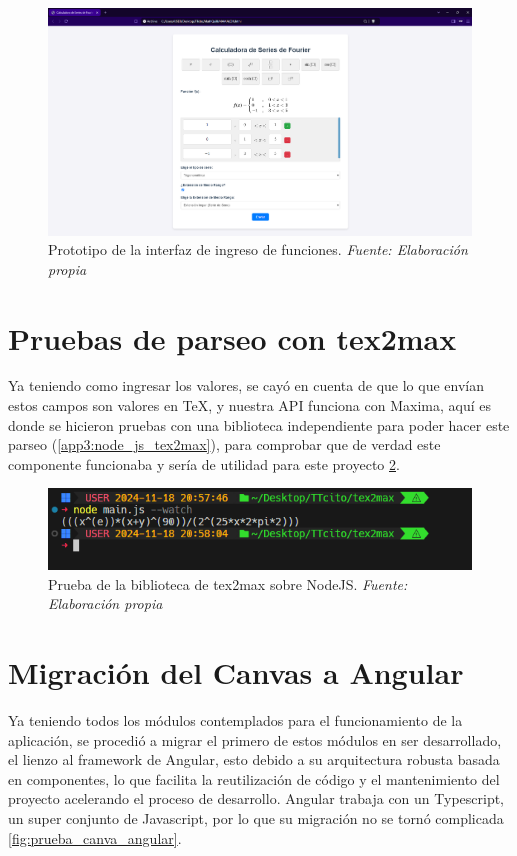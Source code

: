 \begin{figure}[H]
	\centering
	\includegraphics[width=1\textwidth]{img/chapter06/prueba_UI.png}
	\caption[Prototipo de la interfaz de ingreso de funciones.]{Prototipo de la interfaz de ingreso de funciones. \textit{Fuente: Elaboración propia}}
	\label{fig:prueba_UI}
\end{figure}

\section{Pruebas de parseo con tex2max}
Ya teniendo como ingresar los valores, se cayó en cuenta de que lo que envían estos campos son valores en \TeX, y nuestra API funciona con Maxima, aquí es donde se hicieron pruebas con una biblioteca independiente para poder hacer este parseo (\ref{app3:node_js_tex2max}), para comprobar que de verdad este componente funcionaba y sería de utilidad para este proyecto 	\ref{fig:tex2max_node}.
\begin{figure}[H]
	\centering
	\includegraphics[width=1\textwidth]{img/chapter06/tex2max_node.png}
	\caption[Prueba de la biblioteca de tex2max sobre NodeJS.]{Prueba de la biblioteca de tex2max sobre NodeJS. \textit{Fuente: Elaboración propia}}
	\label{fig:tex2max_node}
\end{figure}

\section{Migración del Canvas a Angular}
Ya teniendo todos los módulos contemplados para el funcionamiento de la aplicación, se procedió a migrar el primero de estos módulos en ser desarrollado, el lienzo al framework de Angular, esto debido a su arquitectura robusta basada en componentes, lo que facilita la reutilización de código y el mantenimiento del proyecto acelerando el proceso de desarrollo. Angular trabaja con un Typescript, un super conjunto de Javascript, por lo que su migración no se tornó complicada \ref{fig:prueba_canva_angular}.

